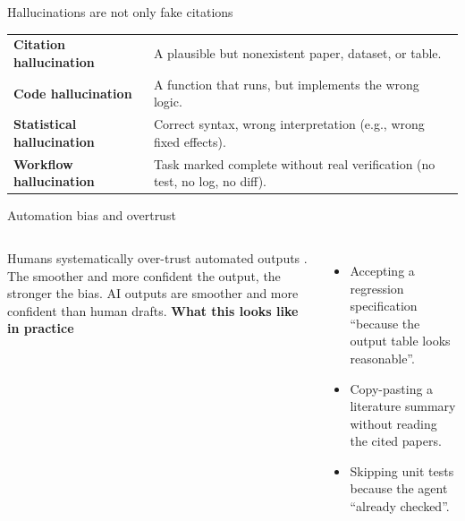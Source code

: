 

\begin{frame}{Hallucinations are not only fake citations}
  \vspace{0.2cm}
  \begin{center}
  \begin{tabularx}{0.92\linewidth}{>{\bfseries\color{deepblue}}lX}
  \toprule
  Citation hallucination & A plausible but nonexistent paper, dataset, or table.\\
  Code hallucination & A function that runs, but implements the wrong logic.\\
  Statistical hallucination & Correct syntax, wrong interpretation (e.g., wrong fixed effects).\\
  Workflow hallucination & Task marked complete without real verification (no test, no log, no diff).\\
  \bottomrule
  \end{tabularx}
  \end{center}
  \vspace{0.4cm}
\end{frame}

\begin{frame}{Automation bias and overtrust}
  \begin{columns}[T,onlytextwidth]
      \threebullets%
        {Humans systematically over-trust automated outputs \citep{skitka_1999_automation_bias}.}%
        {The smoother and more confident the output, the stronger the bias.}%
        {AI outputs are smoother and more confident than human drafts.}
      \textbf{What this looks like in practice}
      \begin{itemize}\setlength\itemsep{0.3em}
        \item Accepting a regression specification ``because the output table looks reasonable''.
        \item Copy-pasting a literature summary without reading the cited papers.
        \item Skipping unit tests because the agent ``already checked''.
      \end{itemize}
  \end{columns}
  \vspace{0.4cm}
\end{frame}

